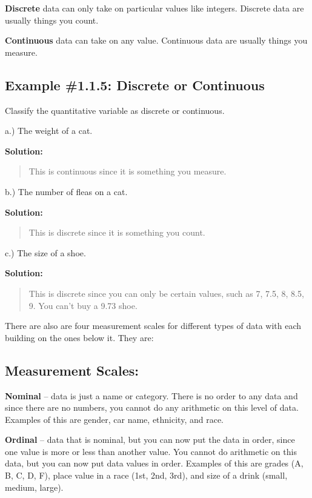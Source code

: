 \documentclass[]{book}
\begin{document}
\textbf{Discrete} data can only take on particular values like integers. Discrete data are usually things you count.

\textbf{Continuous} data can take on any value. Continuous data are usually things you measure.

\hypertarget{example-1.1.5-discrete-or-continuous}{%
\subsection{Example \#1.1.5: Discrete or Continuous}\label{example-1.1.5-discrete-or-continuous}}

Classify the quantitative variable as discrete or continuous.

a.) The weight of a cat.

\textbf{Solution:}

\begin{quote}
This is continuous since it is something you measure.
\end{quote}

b.) The number of fleas on a cat.

\textbf{Solution:}

\begin{quote}
This is discrete since it is something you count.
\end{quote}

c.) The size of a shoe.

\textbf{Solution:}

\begin{quote}
This is discrete since you can only be certain values, such as 7, 7.5, 8, 8.5, 9. You can't buy a 9.73 shoe.
\end{quote}

There are also are four measurement scales for different types of data with each building on the ones below it. They are:

\hypertarget{measurement-scales}{%
\subsection{Measurement Scales:}\label{measurement-scales}}

\textbf{Nominal} -- data is just a name or category. There is no order to any data and since there are no numbers, you cannot do any arithmetic on this level of data. Examples of this are gender, car name, ethnicity, and race.

\textbf{Ordinal} -- data that is nominal, but you can now put the data in order, since one value is more or less than another value. You cannot do arithmetic on this data, but you can now put data values in order. Examples of this are grades (A, B, C, D, F), place value in a race (1st, 2nd, 3rd), and size of a drink (small, medium, large).
\end{document}
